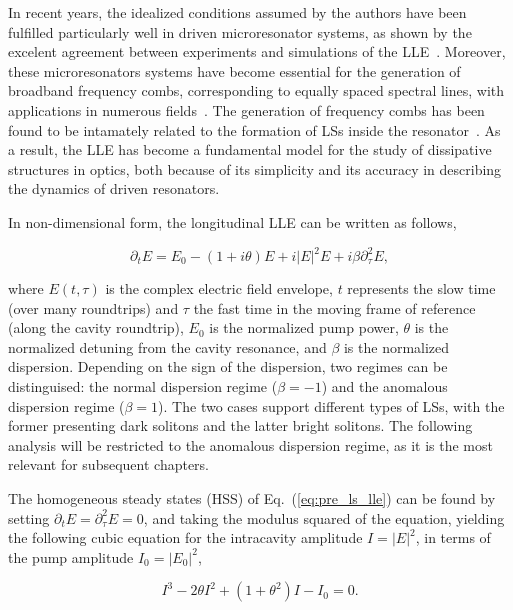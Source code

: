 In recent years, the idealized conditions assumed by the authors have been fulfilled particularly well in driven microresonator
systems, as shown by the excelent agreement between experiments and simulations of the LLE~\cite{grudinin2017high}.
Moreover, these microresonators
systems have become essential for the generation of broadband frequency combs, corresponding to equally
spaced spectral lines, with applications in numerous
fields~\cite{Jost2015clock,marin2017microresonator,suh2019searching}. The generation of frequency combs
has been found to be intamately related to the formation of LSs inside the 
resonator~\cite{coen2012modeling,coen2013universal,chembo2013spatiotemporal}.
As a result,
the LLE has become a fundamental model for the study of dissipative structures in optics, both 
because of its simplicity and its accuracy in describing the dynamics of driven resonators. 

In non-dimensional form, the longitudinal LLE can be written as follows,

\begin{equation}
    \partial_t E = E_0 -(1 + i\theta)E + i |E|^2 E + i\beta \partial_{\tau}^2 E,
    \label{eq:pre_ls_lle}
\end{equation}

\noindent where $E(t, \tau)$ is the complex electric field envelope, $t$ represents the slow time (over many roundtrips)
and $\tau$ the fast time in the moving frame of reference (along the cavity roundtrip), $E_0$ is the normalized pump power, $\theta$ is the normalized
detuning from the cavity resonance, and $\beta$ is the normalized dispersion. Depending on the sign of the dispersion,
two regimes can be distinguised: the normal dispersion regime ($\beta = - 1$) and the anomalous dispersion regime ($\beta = 1$).
The two cases support different types of LSs, with the former presenting dark solitons and the latter bright solitons.
The following analysis will be restricted to the anomalous dispersion regime, as it is the most relevant for subsequent
chapters.

The homogeneous steady states (HSS) of Eq.~(\ref{eq:pre_ls_lle}) can be found by setting $\partial_t E = \partial_{\tau}^2 E = 0$,
and taking the modulus squared of the equation, yielding the following cubic equation for the intracavity amplitude $I = |E|^2$,
in terms of the pump amplitude $I_0 = |E_0|^2$,

\begin{equation}
    I^3 - 2\theta I^2 + (1 + \theta^2)I - I_0 = 0.
    \label{eq:pre_ls_lle_hss}
\end{equation}

